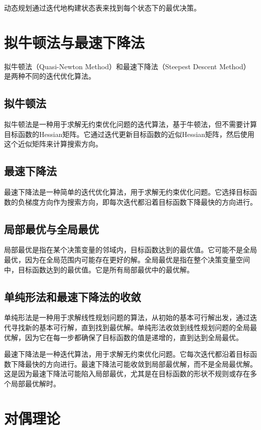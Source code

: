 \documentclass[12pt, a4paper, oneside]{ctexart}
\begin{document}
动态规划通过迭代地构建状态表来找到每个状态下的最优决策。

\section{拟牛顿法与最速下降法}

拟牛顿法（Quasi-Newton Method）和最速下降法（Steepest Descent Method）是两种不同的迭代优化算法。

\subsection{拟牛顿法}

拟牛顿法是一种用于求解无约束优化问题的迭代算法，基于牛顿法，但不需要计算目标函数的Hessian矩阵。它通过迭代更新目标函数的近似Hessian矩阵，然后使用这个近似矩阵来计算搜索方向。

\subsection{最速下降法}

最速下降法是一种简单的迭代优化算法，用于求解无约束优化问题。它选择目标函数的负梯度方向作为搜索方向，即每次迭代都沿着目标函数下降最快的方向进行。

\subsection{局部最优与全局最优}

局部最优是指在某个决策变量的邻域内，目标函数达到的最优值。它可能不是全局最优，因为在全局范围内可能存在更好的解。全局最优是指在整个决策变量空间中，目标函数达到的最优值。它是所有局部最优中的最优解。

\subsection{单纯形法和最速下降法的收敛}

单纯形法是一种用于求解线性规划问题的算法，从初始的基本可行解出发，通过迭代寻找新的基本可行解，直到找到最优解。单纯形法收敛到线性规划问题的全局最优解，因为它在每一步都确保了目标函数的值是递增的，直到达到全局最优。

最速下降法是一种迭代算法，用于求解无约束优化问题。它每次迭代都沿着目标函数下降最快的方向进行。最速下降法可能收敛到局部最优解，而不是全局最优解。这是因为最速下降法可能陷入局部最优，尤其是在目标函数的形状不规则或存在多个局部最优解时。
\section{对偶理论}
\end{document}
